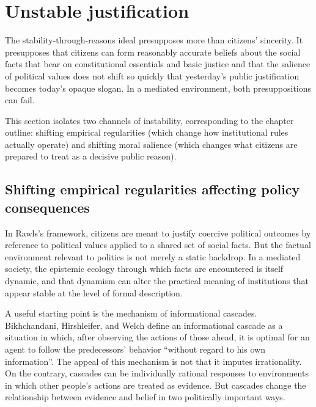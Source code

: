 \documentclass[12pt]{report}
\begin{document}
\section{Unstable justification}\label{sec:ch5-unstable}

The stability-through-reasons ideal presupposes more than citizens’ sincerity. It presupposes that citizens can form reasonably accurate beliefs about the social facts that bear on constitutional essentials and basic justice and that the salience of political values does not shift so quickly that yesterday’s public justification becomes today’s opaque slogan. In a mediated environment, both presuppositions can fail.

This section isolates two channels of instability, corresponding to the chapter outline: shifting empirical regularities (which change how institutional rules actually operate) and shifting moral salience (which changes what citizens are prepared to treat as a decisive public reason).

\subsection{Shifting empirical regularities affecting policy consequences}\label{sec:ch5-empirical}

In Rawls’s framework, citizens are meant to justify coercive political outcomes by reference to political values applied to a shared set of social facts.\parencite[p.~765]{rawls1997public} But the factual environment relevant to politics is not merely a static backdrop. In a mediated society, the epistemic ecology through which facts are encountered is itself dynamic, and that dynamism can alter the practical meaning of institutions that appear stable at the level of formal description.

A useful starting point is the mechanism of informational cascades. Bikhchandani, Hirshleifer, and Welch define an informational cascade as a situation in which, after observing the actions of those ahead, it is optimal for an agent to follow the predecessors’ behavior \enquote{without regard to his own information}.\parencite[p.~992]{bikhchandaniHirshleiferWelch1992cascades} The appeal of this mechanism is not that it imputes irrationality. On the contrary, cascades can be individually rational responses to environments in which other people’s actions are treated as evidence. But cascades change the relationship between evidence and belief in two politically important ways.
\end{document}
